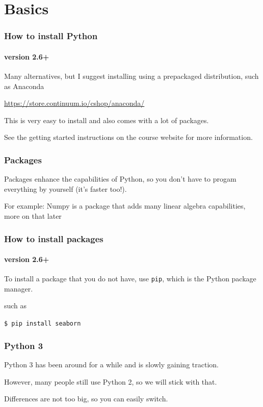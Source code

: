 \section{Basics} %
\label{sec:basics}

\begin{frame}\frametitle{How to install Python}
    \framesubtitle{version 2.6+}

    Many alternatives, but I suggest installing using a prepackaged distribution, such as Anaconda

    \vfill

    \url{https://store.continuum.io/cshop/anaconda/}

    \vfill

    This is very easy to install and also comes with a lot of packages.

    \vfill

    See the getting started instructions on the course website for more information.

\end{frame}

\begin{frame}\frametitle{Packages}

    Packages enhance the capabilities of Python, so you don't have
    to progam everything by yourself (it's faster too!).

    \vfill

    For example: Numpy is a package that adds many linear algebra capabilities, more on that later

\end{frame}

\begin{frame}\frametitle{How to install packages}
    \framesubtitle{version 2.6+}

    To install a package that you do not have, use \texttt{pip},
    which is the Python package manager.

    \vfill

    such as

    \texttt{\$ pip install seaborn}

\end{frame}

\begin{frame}\frametitle{Python 3}

    Python 3 has been around for a while and is slowly gaining traction.

    However, many people still use Python 2, so we will stick with that.

    Differences are not too big, so you can easily switch.

\end{frame}

